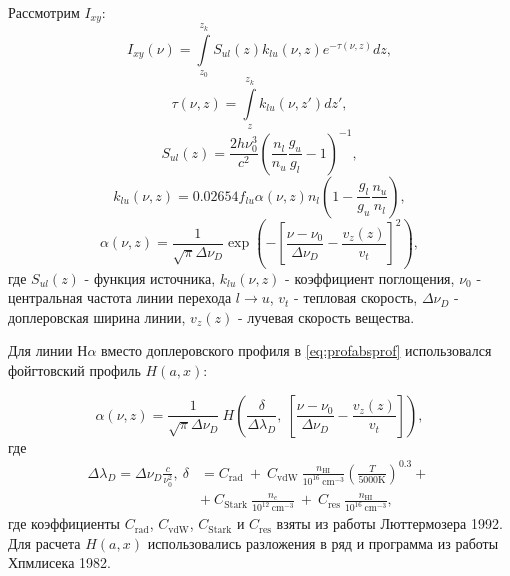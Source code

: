 \documentclass{article}
\begin{document}
Рассмотрим $I_{xy}$:
\begin{equation} \label{eq:profproj}
I_{xy}(\nu) = \int \limits_{z_0}^{z_k} S_{ul}(z)k_{lu}(\nu,z)e^{-\tau(\nu,z)}dz,
\end{equation}
\begin{equation} \label{eq:profdepth}
\tau(\nu,z) = \int \limits_z^{z_k} k_{lu}(\nu,z')dz',
\end{equation}
\begin{equation} \label{eq:profsource}
S_{ul}(z) = \frac{2h\nu_0^3}{c^2}\left(\frac{n_l}{n_u} \frac{g_u}{g_l} - 1 \right)^{-1},
\end{equation}
\begin{equation} \label{eq:profabsorb}
k_{lu}(\nu,z) = 0.02654f_{lu}\alpha(\nu, z)n_l\left(1 - \frac{g_l}{g_u}\frac{n_u}{n_l}\right),
\end{equation}
\begin{equation} \label{eq:profabsprof}
\alpha(\nu, z) = \frac{1}{\sqrt{\pi} \Delta\nu_D} \exp\left( -\left[ \frac{\nu - \nu_0}{\Delta\nu_D} - \frac{v_z(z)}{v_t}\right]^2\right),
\end{equation}
где $S_{ul}(z)$ - функция источника, $k_{lu}(\nu, z)$ - коэффициент поглощения, $\nu_0$ - центральная частота линии перехода $l \rightarrow u$, $v_t$ - тепловая скорость, $\Delta\nu_D$ - доплеровская ширина линии, $v_z(z)$ - лучевая скорость вещества.

Для линии Н$\alpha$ вместо доплеровского профиля в \eqref{eq:profabsprof} использовался фойгтовский профиль $H(a, x)$:

\begin{equation} \label{eq:profabsfoigt}
\alpha(\nu, z) = \frac{1}{\sqrt{\pi} \Delta\nu_D}\ H\left(\frac{\delta}{\Delta\lambda_D},\ \left[ \frac{\nu - \nu_0}{\Delta\nu_D} - \frac{v_z(z)}{v_t}\right]\right),
\end{equation}
где 
\begin{align} \label{eq:foigtcoef}
\Delta\lambda_D = \Delta\nu_D\frac{c}{\nu_0^2},\ \delta & = C_{\text{rad}}\ + \ 
 C_{\text{vdW}}\ \frac{n_{\text{HI}}}{10^{16}\ \text{cm}^{-3}}\left(\frac{T}{5000 \text{K}}\right)^{0.3} +\ \nonumber \\
 &+\ C_{\text{Stark}}\ \frac{n_e}{10^{12}\ \text{cm}^{-3}}\ + \ C_{\text{res}}\ \frac{n_\text{HI}}{10^{16}\ \text{cm}^{-3}},
\end{align}
где коэффициенты $C_\text{rad}$, $C_\text{vdW}$, $C_\text{Stark}$ и $C_\text{res}$ взяты из работы Люттермозера 1992. Для расчета $H(a, x)$ использовались разложения в ряд и программа из работы Хпмлисека 1982.
\end{document}
